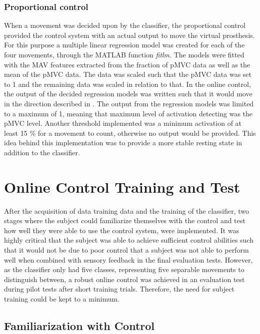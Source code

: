 \subsubsection{Proportional control}  
When a movement was decided upon by the classifier, the proportional control provided the control system with an actual output to move the virtual prosthesis. For this purpose a multiple linear regression model was created for each of the four movements, through the MATLAB function \textit{fitlm}. The models were fitted with the MAV features extracted from the fraction of pMVC data as well as the mean of the pMVC data. The data was scaled such that the pMVC data was set to 1 and the remaining data was scaled in relation to that. In the online control, the output of the decided regression models was written such that it would move in the direction described in . The output from the regression models was limited to a maximum of 1, meaning that maximum level of activation detecting was the pMVC level.  Another threshold implemented was a minimum activation of at least 15 $\percent$ for a movement to count, otherwise no output would be provided. This idea behind this implementation was to provide a more stable resting state in addition to the classifier. 


\section{Online Control Training and Test} \label{sec:meth:contraintest}

After the acquisition of data training data and the training of the classifier, two stages where the subject could familiarize themselves with the control and test how well they were able to use the control system, were implemented. It was highly critical that the subject was able to achieve sufficient control abilities such that it would not be due to poor control that a subject was not able to perform well when combined with sensory feedback in the final evaluation tests. However, as the classifier only had five classes, representing five separable movements to distinguish between, a robust online control was achieved in an evaluation test during pilot tests after short training trials. Therefore, the need for subject training could be kept to a minimum.  

\subsection{Familiarization with Control} \label{sec:meth:contrain}

